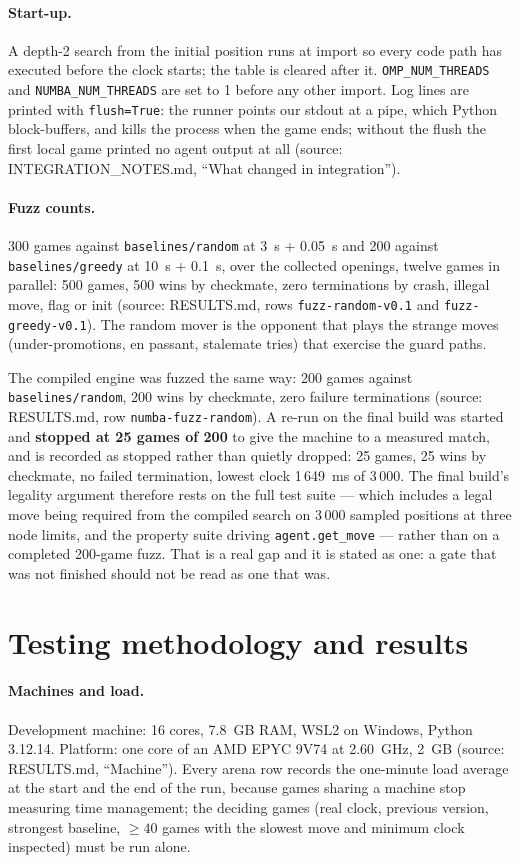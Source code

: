 \documentclass[11pt,a4paper]{article}
\newcommand{\src}[1]{{\small(source: #1)}}
\newcommand{\code}[1]{\texttt{#1}}
\begin{document}
\paragraph{Start-up.} A depth-2 search from the initial position runs at import so every code path has
executed before the clock starts; the table is cleared after it. \code{OMP\_NUM\_THREADS} and
\code{NUMBA\_NUM\_THREADS} are set to 1 before any other import. Log lines are printed with
\code{flush=True}: the runner points our stdout at a pipe, which Python block-buffers, and kills the
process when the game ends; without the flush the first local game printed no agent output at all
\src{INTEGRATION\_NOTES.md, ``What changed in integration''}.
\paragraph{Fuzz counts.} 300 games against \code{baselines/random} at 3~s + 0.05~s and 200 against
\code{baselines/greedy} at 10~s + 0.1~s, over the collected openings, twelve games in parallel: 500 games,
500 wins by checkmate, zero terminations by crash, illegal move, flag or init
\src{RESULTS.md, rows \code{fuzz-random-v0.1} and \code{fuzz-greedy-v0.1}}. The random mover is the
opponent that plays the strange moves (under-promotions, en passant, stalemate tries) that exercise the
guard paths.

The compiled engine was fuzzed the same way: 200 games against \code{baselines/random}, 200 wins by
checkmate, zero failure terminations \src{RESULTS.md, row \code{numba-fuzz-random}}. A re-run on the final
build was started and \textbf{stopped at 25 games of 200} to give the machine to a measured match, and is
recorded as stopped rather than quietly dropped: 25 games, 25 wins by checkmate, no failed termination,
lowest clock 1\,649~ms of 3\,000. The final build's legality argument therefore rests on the full test
suite --- which includes a legal move being required from the compiled search on 3\,000 sampled positions
at three node limits, and the property suite driving \code{agent.get\_move} --- rather than on a completed
200-game fuzz. That is a real gap and it is stated as one: a gate that was not finished should not be
read as one that was.

\section{Testing methodology and results}\label{sec:testing}
\paragraph{Machines and load.} Development machine: 16 cores, 7.8~GB RAM, WSL2 on Windows, Python
3.12.14. Platform: one core of an AMD EPYC 9V74 at 2.60~GHz, 2~GB \src{RESULTS.md, ``Machine''}. Every
arena row records the one-minute load average at the start and the end of the run, because games sharing
a machine stop measuring time management; the deciding games (real clock, previous version, strongest
baseline, $\geq 40$ games with the slowest move and minimum clock inspected) must be run alone.
\end{document}
